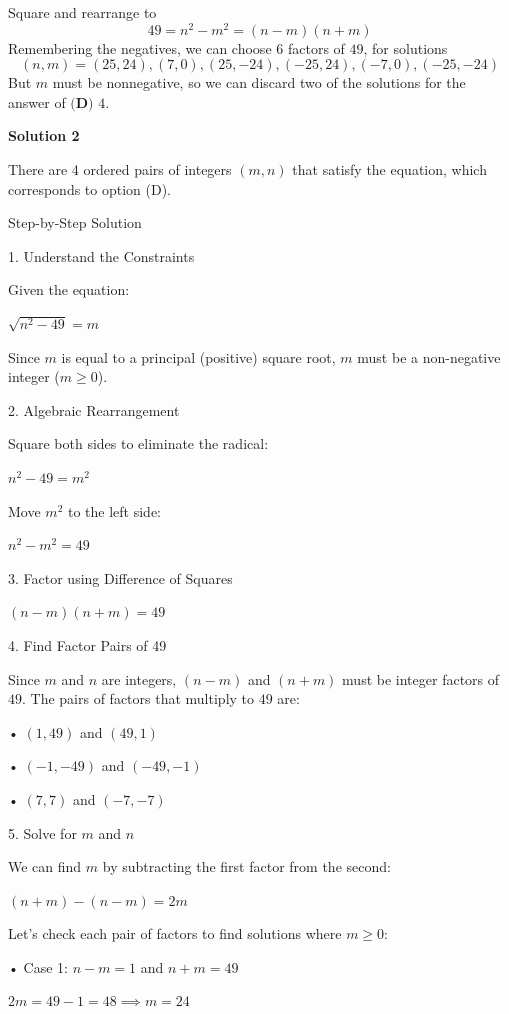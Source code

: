 \begin{enumerate}
Square and rearrange to 
 \[49 = n^2-m^2 = (n-m)(n+m)\] Remembering the negatives, we can choose $6$ factors of $49$, for solutions 
 \[(n, m) = (25, 24), (7, 0), (25, -24), (-25, 24), (-7, 0), (-25, -24)\] But $m$ must be nonnegative, so we can discard two of the solutions for the answer of $\boxed{\textbf{(D) }4}$.

 


 



\textbf{Solution 2}

There are 4 ordered pairs of integers \((m, n)\) that satisfy the equation, which corresponds to option (D).

 Step-by-Step Solution

 1. Understand the Constraints

 Given the equation:

 \(\sqrt{n^{2}-49}=m\)

 Since \(m\) is equal to a principal (positive) square root, \(m\) must be a non-negative integer (\(m \ge 0\)).

 2. Algebraic Rearrangement

 Square both sides to eliminate the radical:

 \(n^{2}-49=m^{2}\)

 Move \(m^{2}\) to the left side:

 \(n^{2}-m^{2}=49\)

 3. Factor using Difference of Squares

 \((n-m)(n+m)=49\)

 4. Find Factor Pairs of 49

 Since \(m\) and \(n\) are integers, \((n - m)\) and \((n + m)\) must be integer factors of \(49\). The pairs of factors that multiply to \(49\) are:

 	• \((1, 49)\) and \((49, 1)\)

 	• \((-1, -49)\) and \((-49, -1)\)

 	• \((7, 7)\) and \((-7, -7)\)

 5. Solve for \(m\) and \(n\)

 We can find \(m\) by subtracting the first factor from the second:

 \((n+m)-(n-m)=2m\)

 Let's check each pair of factors to find solutions where \(m \ge 0\):

 	• Case 1: \(n - m = 1\) and \(n + m = 49\)

 \(2m=49-1=48\implies m=24\)


\end{enumerate}
